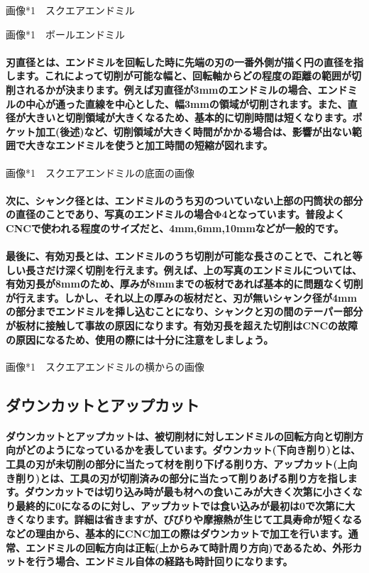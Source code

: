 \documentclass[b5paper, 9pt, twocolumn, titlepage,openany]{jsbook}%
\begin{document}
画像*1　スクエアエンドミル

画像*1　ボールエンドミル

\paragraph{刃直径とは、エンドミルを回転した時に先端の刃の一番外側が描く円の直径を指します。これによって切削が可能な幅と、回転軸からどの程度の距離の範囲が切削されるかが決まります。例えば刃直径が3mmのエンドミルの場合、エンドミルの中心が通った直線を中心とした、幅3mmの領域が切削されます。また、直径が大きいと切削領域が大きくなるため、基本的に切削時間は短くなります。ポケット加工(後述)など、切削領域が大きく時間がかかる場合は、影響が出ない範囲で大きなエンドミルを使うと加工時間の短縮が図れます。}

画像*1　スクエアエンドミルの底面の画像

\paragraph{次に、シャンク径とは、エンドミルのうち刃のついていない上部の円筒状の部分の直径のことであり、写真のエンドミルの場合Φ4となっています。普段よくCNCで使われる程度のサイズだと、4mm,6mm,10mmなどが一般的です。}
\paragraph{最後に、有効刃長とは、エンドミルのうち切削が可能な長さのことで、これと等しい長さだけ深く切削を行えます。例えば、上の写真のエンドミルについては、有効刃長が8mmのため、厚みが8mmまでの板材であれば基本的に問題なく切削が行えます。しかし、それ以上の厚みの板材だと、刃が無いシャンク径が4mmの部分までエンドミルを挿し込むことになり、シャンクと刃の間のテーパー部分が板材に接触して事故の原因になります。有効刃長を超えた切削はCNCの故障の原因になるため、使用の際には十分に注意をしましょう。}

画像*1　スクエアエンドミルの横からの画像

\subsection{ダウンカットとアップカット}

\paragraph{ダウンカットとアップカットは、被切削材に対しエンドミルの回転方向と切削方向がどのようになっているかを表しています。ダウンカット(下向き削り)とは、工具の刃が未切削の部分に当たって材を削り下げる削り方、アップカット(上向き削り)とは、工具の刃が切削済みの部分に当たって削りあげる削り方を指します。ダウンカットでは切り込み時が最も材への食いこみが大きく次第に小さくなり最終的に0になるのに対し、アップカットでは食い込みが最初は0で次第に大きくなります。詳細は省きますが、びびりや摩擦熱が生じて工具寿命が短くなるなどの理由から、基本的にCNC加工の際はダウンカットで加工を行います。通常、エンドミルの回転方向は正転(上からみて時計周り方向)であるため、外形カットを行う場合、エンドミル自体の経路も時計回りになります。}
\end{document}

